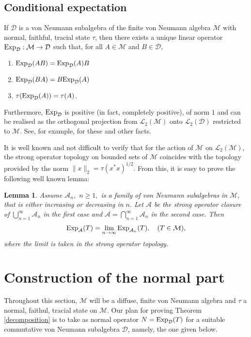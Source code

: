\documentclass{amsart}
\theoremstyle{plain}
\newtheorem{lem}[thm]{Lemma}
\theoremstyle{remark}
\begin{document}
\subsection{Conditional expectation}

If $\mathcal{D}$ is a von Neumann subalgebra of the finite von Neumann algebra $\mathcal{M}$
with normal, faithful, tracial state $\tau$,
then there exists a unique linear operator ${\rm Exp}_{\mathcal{D}}:\mathcal{M}\to\mathcal{D}$ such that,  for all $A\in\mathcal{M}$ and $B\in\mathcal{D}$,
\begin{enumerate}[{\rm (a)}]
\item ${\rm Exp}_{\mathcal{D}}(AB)={\rm Exp}_{\mathcal{D}}(A)B$
\item ${\rm Exp}_{\mathcal{D}}(BA)=B{\rm Exp}_{\mathcal{D}}(A)$
\item $\tau({\rm Exp}_{\mathcal{D}}(A))=\tau(A)$.
\end{enumerate}
Furthermore, ${\rm Exp}_{\mathcal{D}}$ is positive (in fact, completely positive), of norm $1$ and can be realised as the orthogonal projection from $\mathcal{L}_2(\mathcal{M})$ onto $\mathcal{L}_2(\mathcal{D})$ restricted to $\mathcal{M}$.
See, for example, \cite{SS} for these and other facts.

It is well known and not difficult to verify that for the action of $\mathcal{M}$ on $\mathcal{L}_2(\mathcal{M})$,
the strong operator topology on bounded sets
of $\mathcal{M}$ coincides with the topology provided by the norm $\|x\|_2=\tau(x^*x)^{1/2}$.
From this, it is easy to prove the following well known lemma:
\begin{lem}\label{exp limit lemma} Assume $\mathcal{A}_n,$ $n\geq1,$ is a family of von Neumann subalgebras in $\mathcal{M},$
that is either increasing or decreasing in $n.$ Let $\mathcal{A}$ be the strong operator closure of $\bigcup_{n=1}^\infty\mathcal{A}_n$ in the first case
and $\mathcal{A}=\bigcap_{n=1}^\infty\mathcal{A}_n$ in the second case. Then
$${\rm Exp}_{\mathcal{A}}(T)=\lim_{n\to\infty}{\rm Exp}_{\mathcal{A}_n}(T),\quad(T\in\mathcal{M}),$$
where the limit is taken in the strong operator topology.
\end{lem}

\section{Construction of the normal part}

Throughout this section, $\mathcal{M}$ will be a diffuse, finite von Neumann algebra and $\tau$ a
normal, faithul, tracial state on $\mathcal{M}$.
Our plan for proving Theorem \ref{decomposition} is to take as normal operator $N={\rm Exp}_{\mathcal{D}}(T)$ for a suitable commutative von Neumann subalgebra $\mathcal{D}$, namely, the one given below.
\end{document}
